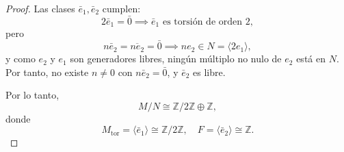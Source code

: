 \begin{proof}
	Las clases \(\bar{e}_1, \bar{e}_2\) cumplen:
	\[
	2 \bar{e}_1 = \bar{0} \implies \bar{e}_1 \text{ es torsión de orden 2},
	\]
	pero
	\[
	n \bar{e}_2 = \overline{n e_2} = \bar{0} \implies n e_2 \in N = \langle 2 e_1 \rangle,
	\]
	y como \(e_2\) y \(e_1\) son generadores libres, ningún múltiplo no nulo de \(e_2\) está en \(N\). Por tanto, no existe \(n \neq 0\) con \(n \bar{e}_2 = \bar{0}\), y \(\bar{e}_2\) es libre.
	
	Por lo tanto,
	\[
	M/N \cong \mathbb{Z}/2\mathbb{Z} \oplus \mathbb{Z},
	\]
	donde
	\[
	M_{\text{tor}} = \langle \bar{e}_1 \rangle \cong \mathbb{Z}/2\mathbb{Z}, \quad F = \langle \bar{e}_2 \rangle \cong \mathbb{Z}.
	\]
	
\end{proof}


